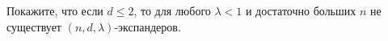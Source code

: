 Покажите, что если $d \le 2$, то для любого $\lambda < 1$ и достаточно больших $n$ не существует $(n, d,
\lambda)$-экспандеров.